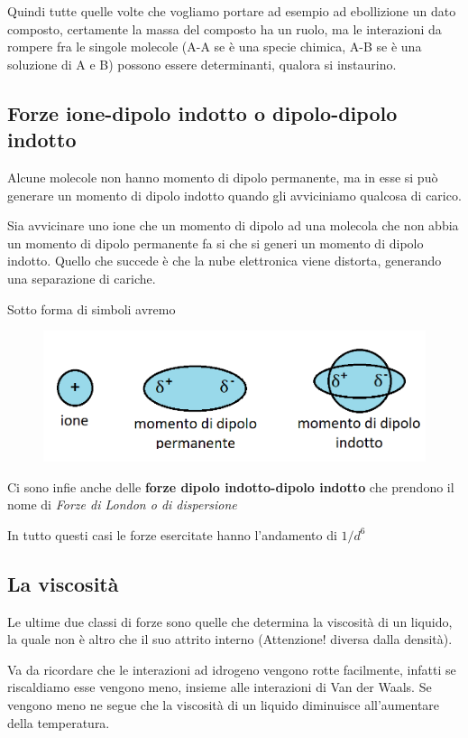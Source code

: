 \vspace{0.2cm}Quindi tutte quelle volte che vogliamo portare ad esempio ad ebollizione un dato composto, certamente la massa del composto ha un ruolo, ma le interazioni da rompere fra le singole molecole (A-A se è una specie chimica, A-B se è una soluzione di A e B) possono essere determinanti, qualora si instaurino.

\subsection{Forze ione-dipolo indotto o dipolo-dipolo indotto}
Alcune molecole non hanno momento di dipolo permanente, ma in esse si può generare un momento di dipolo indotto quando gli avviciniamo qualcosa di carico.

Sia avvicinare uno ione che un momento di dipolo ad una molecola che non abbia un momento di dipolo permanente fa si che si generi un momento di dipolo indotto. Quello che succede è che la nube elettronica viene distorta, generando una separazione di cariche.

Sotto forma di simboli avremo

\begin{figure}[htp]
    \centering
    \includegraphics[width=12cm]{immagini/ioni_e_momenti_di_dipolo.png}
\end{figure}

Ci sono infie anche delle \textbf{forze dipolo indotto-dipolo indotto} che prendono il nome di \textit{Forze di London o di dispersione}

In tutto questi casi le forze esercitate hanno l'andamento di $1/d^6$
\subsection{La viscosità}
Le ultime due classi di forze sono quelle che determina la viscosità di un liquido, la quale non è altro che il suo attrito interno (Attenzione! \E diversa dalla densità).

Va da ricordare che le interazioni ad idrogeno vengono rotte facilmente, infatti se riscaldiamo esse vengono meno, insieme alle interazioni di Van der Waals. Se vengono meno ne segue che la viscosità di un liquido diminuisce all'aumentare della temperatura.